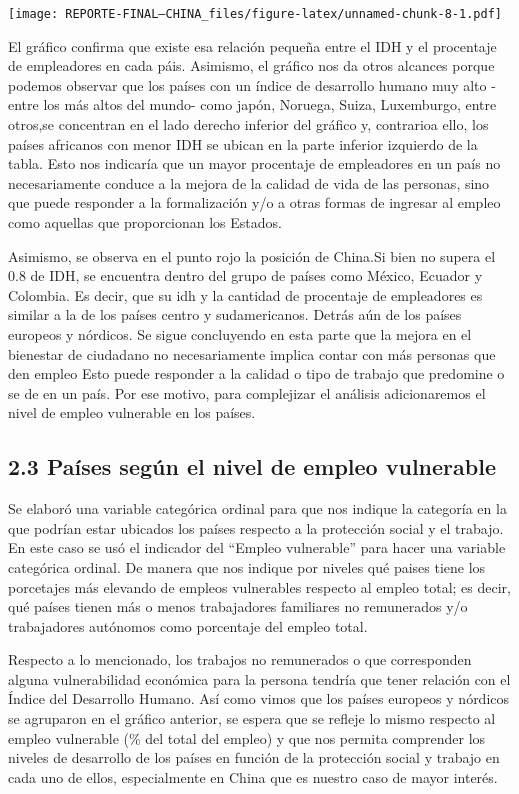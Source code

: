 \documentclass[
]{article}
\begin{document}
\texttt{[image: REPORTE-FINAL--CHINA\_files/figure-latex/unnamed-chunk-8-1.pdf]}

El gráfico confirma que existe esa relación pequeña entre el IDH y el
procentaje de empleadores en cada páis. Asimismo, el gráfico nos da
otros alcances porque podemos observar que los países con un índice de
desarrollo humano muy alto -entre los más altos del mundo- como japón,
Noruega, Suiza, Luxemburgo, entre otros,se concentran en el lado derecho
inferior del gráfico y, contrarioa ello, los países africanos con menor
IDH se ubican en la parte inferior izquierdo de la tabla. Esto nos
indicaría que un mayor procentaje de empleadores en un país no
necesariamente conduce a la mejora de la calidad de vida de las
personas, sino que puede responder a la formalización y/o a otras formas
de ingresar al empleo como aquellas que proporcionan los Estados.

Asimismo, se observa en el punto rojo la posición de China.Si bien no
supera el 0.8 de IDH, se encuentra dentro del grupo de países como
México, Ecuador y Colombia. Es decir, que su idh y la cantidad de
procentaje de empleadores es similar a la de los países centro y
sudamericanos. Detrás aún de los países europeos y nórdicos. Se sigue
concluyendo en esta parte que la mejora en el bienestar de ciudadano no
necesariamente implica contar con más personas que den empleo Esto puede
responder a la calidad o tipo de trabajo que predomine o se de en un
país. Por ese motivo, para complejizar el análisis adicionaremos el
nivel de empleo vulnerable en los países.

\hypertarget{pauxedses-seguxfan-el-nivel-de-empleo-vulnerable}{%
\subsection{2.3 Países según el nivel de empleo
vulnerable}\label{pauxedses-seguxfan-el-nivel-de-empleo-vulnerable}}

Se elaboró una variable categórica ordinal para que nos indique la
categoría en la que podrían estar ubicados los países respecto a la
protección social y el trabajo. En este caso se usó el indicador del
``Empleo vulnerable'' para hacer una variable categórica ordinal. De
manera que nos indique por niveles qué paises tiene los porcetajes más
elevando de empleos vulnerables respecto al empleo total; es decir, qué
países tienen más o menos trabajadores familiares no remunerados y/o
trabajadores autónomos como porcentaje del empleo total.

Respecto a lo mencionado, los trabajos no remunerados o que corresponden
alguna vulnerabilidad económica para la persona tendría que tener
relación con el Índice del Desarrollo Humano. Así como vimos que los
países europeos y nórdicos se agruparon en el gráfico anterior, se
espera que se refleje lo mismo respecto al empleo vulnerable (\% del
total del empleo) y que nos permita comprender los niveles de desarrollo
de los países en función de la protección social y trabajo en cada uno
de ellos, especialmente en China que es nuestro caso de mayor interés.
\end{document}
